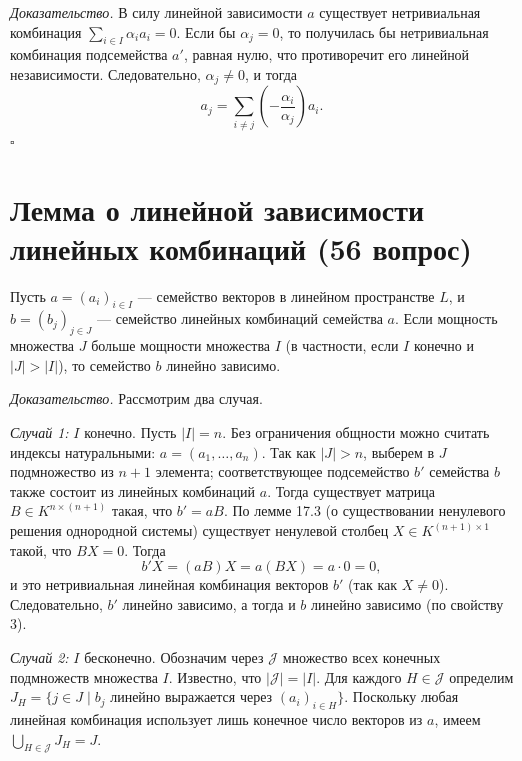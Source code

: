 \documentclass[a4paper,12pt]{article}
\theoremstyle{definition}
\theoremstyle{plain}
\theoremstyle{remark}
\begin{document}
	\medskip
	\textit{Доказательство.}
	В силу линейной зависимости \( a \) существует нетривиальная комбинация \( \sum_{i \in I} \alpha_i a_i = 0 \). Если бы \( \alpha_j = 0 \), то получилась бы нетривиальная комбинация подсемейства \( a' \), равная нулю, что противоречит его линейной независимости. Следовательно, \( \alpha_j \neq 0 \), и тогда
	\[
	a_j = \sum_{i \neq j} \left( -\frac{\alpha_i}{\alpha_j} \right) a_i.
	\]
	\hfill \(\square\)
	
	
	
	
	
	
	
	
	\newpage	
	\section{Лемма о линейной зависимости линейных комбинаций (56 вопрос)}
	
	\begin{tcolorbox}[colback=blue!5, colframe=blue!40!black, title=Лемма (о линейной зависимости линейных комбинаций)]
		Пусть \( a = (a_i)_{i \in I} \) — семейство векторов в линейном пространстве \( L \), и \( b = (b_j)_{j \in J} \) — семейство линейных комбинаций семейства \( a \). Если мощность множества \( J \) больше мощности множества \( I \) (в частности, если \( I \) конечно и \( |J| > |I| \)), то семейство \( b \) линейно зависимо.
	\end{tcolorbox}
	
	\medskip
	\textit{Доказательство.}
	Рассмотрим два случая.
	
	\textit{Случай 1:} \( I \) конечно. Пусть \( |I| = n \). Без ограничения общности можно считать индексы натуральными: \( a = (a_1, \dots, a_n) \). Так как \( |J| > n \), выберем в \( J \) подмножество из \( n+1 \) элемента; соответствующее подсемейство \( b' \) семейства \( b \) также состоит из линейных комбинаций \( a \). Тогда существует матрица \( B \in K^{n \times (n+1)} \) такая, что \( b' = aB \). По лемме 17.3 (о существовании ненулевого решения однородной системы) существует ненулевой столбец \( X \in K^{(n+1) \times 1} \) такой, что \( BX = 0 \). Тогда
	\[
	b'X = (aB)X = a(BX) = a \cdot 0 = 0,
	\]
	и это нетривиальная линейная комбинация векторов \( b' \) (так как \( X \neq 0 \)). Следовательно, \( b' \) линейно зависимо, а тогда и \( b \) линейно зависимо (по свойству 3).
	
	\textit{Случай 2:} \( I \) бесконечно. Обозначим через \( \mathcal{J} \) множество всех конечных подмножеств множества \( I \). Известно, что \( |\mathcal{J}| = |I| \). Для каждого \( H \in \mathcal{J} \) определим \( J_H = \{ j \in J \mid b_j \text{ линейно выражается через } (a_i)_{i \in H} \} \). Поскольку любая линейная комбинация использует лишь конечное число векторов из \( a \), имеем \( \bigcup_{H \in \mathcal{J}} J_H = J \).
	
\end{document}
